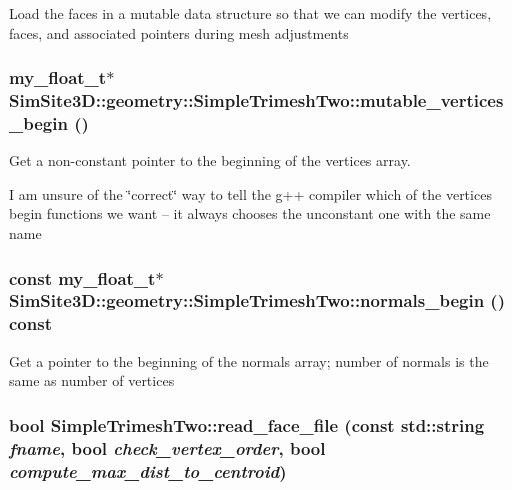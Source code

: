 Load the faces in a mutable data structure so that we can modify the vertices, faces, and associated pointers during mesh adjustments 
\subsubsection{\setlength{\rightskip}{0pt plus 5cm}my\_\-float\_\-t$\ast$ SimSite3D::geometry::Simple\-Trimesh\-Two::mutable\_\-vertices\_\-begin ()\hspace{0.3cm}{\tt  [inline, protected]}}\label{classSimSite3D_1_1geometry_1_1SimpleTrimeshTwo_18ef85d591b174d42f848ede475e2268}


Get a non-constant pointer to the beginning of the vertices array. 

I am unsure of the \char`\"{}correct\char`\"{} way to tell the g++ compiler which of the vertices begin functions we want -- it always chooses the unconstant one with the same name 
\subsubsection{\setlength{\rightskip}{0pt plus 5cm}const my\_\-float\_\-t$\ast$ SimSite3D::geometry::Simple\-Trimesh\-Two::normals\_\-begin () const\hspace{0.3cm}{\tt  [inline]}}\label{classSimSite3D_1_1geometry_1_1SimpleTrimeshTwo_b217b72c8e69c61f286c958da6439093}


Get a pointer to the beginning of the normals array; number of normals is the same as number of vertices 
\subsubsection{\setlength{\rightskip}{0pt plus 5cm}bool Simple\-Trimesh\-Two::read\_\-face\_\-file (const std::string {\em fname}, bool {\em check\_\-vertex\_\-order}, bool {\em compute\_\-max\_\-dist\_\-to\_\-centroid})\hspace{0.3cm}{\tt  [protected]}}\label{classSimSite3D_1_1geometry_1_1SimpleTrimeshTwo_81ecdfec18b36033de2e791107dfe69f}


